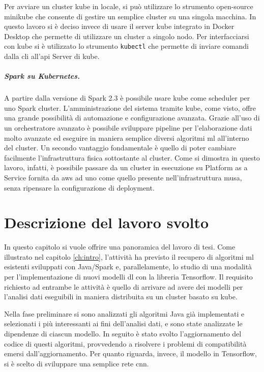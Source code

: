 \documentclass[12pt,a4paper,fleqn,titlepage]{report}
\begin{document}
        Per avviare un \gls{cluster} \gls{kube} in locale, si può utilizzare lo strumento open-source minikube che consente di gestire un semplice \gls{cluster} su una singola macchina. In questo lavoro si è deciso invece di usare il server \gls{kube} integrato in Docker Desktop che permette di utilizzare un \gls{cluster} a singolo nodo. Per interfacciarsi con \gls{kube} si è utilizzato lo strumento \lstinline{kubectl} che permette di inviare comandi dalla \gls{cli} all'\gls{api} Server di \gls{kube}.

        \paragraph{Spark su Kubernetes.}
        A partire dalla versione di Spark 2.3 è possibile usare \gls{kube} come scheduler per uno Spark \gls{cluster}. L'amministrazione del sistema tramite \gls{kube}, come visto, offre una grande possibilità di automazione e configurazione avanzata.
        Grazie all'uso di un orchestratore avanzato è possibile sviluppare pipeline per l'elaborazione dati molto avanzate ed eseguire in maniera semplice diversi algoritmi \gls{ml} all'interno del \gls{cluster}. Un secondo vantaggio fondamentale è quello di poter cambiare facilmente l'infrastruttura fisica sottostante al \gls{cluster}. Come si dimostra in questo lavoro, infatti, è possibile passare da un cluster in esecuzione su Platform as a Service fornita da \gls{aws} ad uno come quello presente nell'infrastruttura \gls{musa}, senza ripensare la configurazione di deployment.

\chapter{Descrizione del lavoro svolto}\label{ch:work}
    In questo capitolo si vuole offrire una panoramica del lavoro di tesi.
    Come illustrato nel capitolo \ref{ch:intro}, l'attività ha previsto il recupero di algoritmi \gls{ml} esistenti sviluppati con Java/Spark e, parallelamente, lo studio di una modalità per l'implementazione di nuovi modelli \gls{dl} con la libreria Tensorflow. Il requisito richiesto ad entrambe le attività è quello di arrivare ad avere dei modelli per l'analisi dati eseguibili in maniera distribuita su un \gls{cluster} basato su \gls{kube}.

    Nella fase preliminare si sono analizzati gli algoritmi Java già implementati e selezionati i più interessanti ai fini dell'analisi dati, e sono state analizzate le dipendenze di ciascun modello. In seguito è stato svolto l'aggiornamento del codice di questi algoritmi, provvedendo a risolvere i problemi di compatibilità emersi dall'aggiornamento. Per quanto riguarda, invece, il modello in Tensorflow, si è scelto di sviluppare una semplice rete \gls{cnn}.
\end{document}
